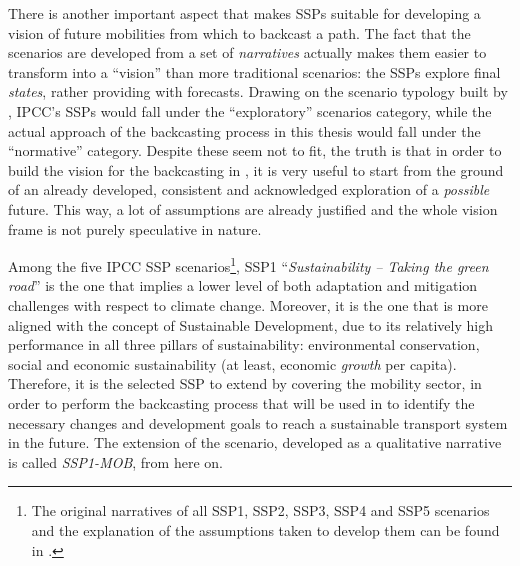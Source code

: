 There is another important aspect that makes SSPs suitable for developing a vision of future mobilities from which to backcast a path. The fact that the scenarios are developed from a set of \emph{narratives} actually makes them easier to transform into a ``vision'' than more traditional scenarios: the SSPs explore final \emph{states}, rather providing with forecasts. Drawing on the scenario typology built by \textcite{boerjeson2006_Scenariotypestechniques}, IPCC's SSPs would fall under the ``exploratory'' scenarios category, while the actual approach of the backcasting process in this thesis would fall under the ``normative'' category. Despite these seem not to fit, the truth is that in order to build the vision for the backcasting in , it is very useful to start from the ground of an already developed, consistent and acknowledged exploration of a \emph{possible} future. This way, a lot of assumptions are already justified and the whole vision frame is not purely speculative in nature.

Among the five IPCC \gls{SSP} scenarios\footnote{The original narratives of all SSP1, SSP2, SSP3, SSP4 and SSP5 scenarios and the explanation of the assumptions taken to develop them can be found in \textcite{oneill2017_roadsaheadNarratives}.}, SSP1 ``\textit{Sustainability -- Taking the green road}'' is the one that implies a lower level of both adaptation and mitigation challenges with respect to climate change. Moreover, it is the one that is more aligned with the concept of Sustainable Development, due to its relatively high performance in all three pillars of sustainability: environmental conservation, social and economic sustainability (at least, economic \emph{growth} per capita). Therefore, it is the selected SSP to extend by covering the mobility sector, in order to perform the backcasting process that will be used in  to identify the necessary changes and development goals to reach a sustainable transport system in the future. The extension of the scenario, developed as a qualitative narrative is called \emph{SSP1-MOB}, from here on.

